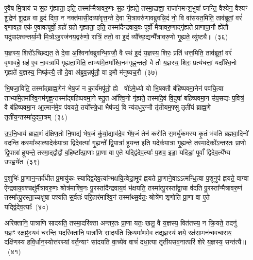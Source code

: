 ए॒वैष मि॒त्राय॑ च स॒ह गृ॑ह्याता॒ इति॒ तस्मा᳚न्मैत्रावरु॒णः स॒ह गृ॑ह्यते॒ तस्मा॒द्राज्ञा॒ राजा॑नमꣳश॒भुवा᳚ घ्नन्ति॒ वैश्ये॑न॒ वैश्यꣳ॑ शू॒द्रेण॑ शू॒द्रन्न वा इ॒दं दिवा॒ न नक्त॑मासी॒दव्या॑वृत्त॒न्ते दे॒वा मि॒त्रावरु॑णावब्रुवन्नि॒दं नो॒ वि वा॑सयत॒मिति॒ ताव॑ब्रूतां॒ वरं॑ वृणावहा॒ एक॑ ए॒वावत्पूर्वो॒ ग्रहो॑ ग्रहो गृह्याता॒ इति॒ तस्मा॑दैन्द्रवाय॒वः पूर्वो॑ मैत्रावरु॒णाद्गृ॑ह्यते प्राणापा॒नौ ह्ये॑तौ यदु॑पाꣴश्वन्तर्या॒मौ मि॒त्रो\-ऽह॒रज॑नय॒द्वरु॑णो॒ रात्रिं॒ ततो॒ वा इ॒दं व्यौ᳚च्छ॒द्यन्मै᳚त्रावरु॒णो गृ॒ह्यते॒ व्यु॑ष्ट्यै॥~(३६)

{\anuvakamend[{ए॒ष चै᳚न्द्रवाय॒वो द्वाविꣳ॑शतिश्च}]}%

य॒ज्ञस्य॒ शिरो᳚\-ऽच्छिद्यत॒ ते दे॒वा अ॒श्विना॑वब्रुवन्भि॒षजौ॒ वै स्थ॑ इ॒दं य॒ज्ञस्य॒ शिरः॒ प्रति॑ धत्त॒मिति॒ ताव॑ब्रूतां॒ वरं॑ वृणावहै॒ ग्रह॑ ए॒व ना॒वत्रापि॑ गृह्यता॒मिति॒ ताभ्या॑मे॒तमा᳚श्वि॒नम॑गृह्ण॒न्ततो॒ वै तौ य॒ज्ञस्य॒ शिरः॒ प्रत्य॑धत्तां॒ यदा᳚श्वि॒नो गृ॒ह्यते॑ य॒ज्ञस्य॒ निष्कृ॑त्यै॒ तौ दे॒वा अ॑ब्रुव॒न्नपू॑तौ॒ वा इ॒मौ म॑नुष्यच॒रौ~(३७)

भि॒षजा॒विति॒ तस्मा᳚द्ब्राह्म॒णेन॑ भेष॒जं न का॒र्य॑मपू॑तो॒ ह्ये  षो॑\-ऽमे॒ध्यो यो भि॒षक्तौ ब॑हिष्पवमा॒नेन॑ पवयि॒त्वा ताभ्या॑मे॒तमा᳚श्वि॒नम॑गृह्ण॒न्तस्मा᳚द्बहिष्पवमा॒ने स्तु॒त आ᳚श्वि॒नो गृ॑ह्यते॒ तस्मा॑दे॒वं वि॒दुषा॑ बहिष्पवमा॒न उ॑प॒सद्यः॑ प॒वित्रं॒ वै ब॑हिष्पवमा॒न आ॒त्मान॑मे॒व प॑वयते॒ तयो᳚स्त्रे॒धा भैष॑ज्यं॒ वि न्य॑दधुर॒ग्नौ तृ॑तीयम॒फ्सु तृती॑यं ब्राह्म॒णे तृती॑य॒न्तस्मा॑दुदपा॒त्रम्~(३८)

उ॒प॒नि॒धाय॑ ब्राह्म॒णं द॑क्षिण॒तो नि॒षाद्य॑ भेष॒जं कु॑र्या॒द्याव॑दे॒व भे॑ष॒जं तेन॑ करोति स॒मर्धु॑कमस्य कृ॒तं भ॑वति ब्रह्मवा॒दिनो॑ वदन्ति॒ कस्मा᳚थ्स॒त्यादेक॑पात्रा द्विदेव॒त्या॑ गृ॒ह्यन्ते᳚ द्वि॒पात्रा॑ हूयन्त॒ इति॒ यदेक॑पात्रा गृ॒ह्यन्ते॒ तस्मा॒देको᳚\-ऽन्तर॒तः प्रा॒णो द्वि॒पात्रा॑ हूयन्ते॒ तस्मा॒द्द्वौद्वौ॑ ब॒हिष्टा᳚त्प्रा॒णाः प्रा॒णा वा ए॒ते यद्द्वि॑देव॒त्याः᳚ प॒शव॒ इडा॒ यदिडां॒ पूर्वां᳚ द्विदेव॒त्ये᳚भ्य उप॒ह्वये॑त~(३९)

प॒शुभिः॑ प्रा॒णान॒न्तर्द॑धीत प्र॒मायु॑कः स्याद्द्विदेव॒त्या᳚न्भक्षयि॒त्वेडा॒मुप॑ ह्वयते प्रा॒णाने॒वा\-ऽऽ\-त्मन्धि॒त्वा प॒शूनुप॑ ह्वयते॒ वाग्वा ऐ᳚न्द्रवाय॒वश्चक्षु॑र्मैत्रावरु॒णः श्रोत्र॑माश्वि॒नः पु॒रस्ता॑दैन्द्रवाय॒वं भ॑क्षयति॒ तस्मा᳚त्पु॒रस्ता᳚द्वा॒चा व॑दति पु॒रस्ता᳚न्मैत्रावरु॒णं तस्मा᳚त्पु॒रस्ता॒च्चक्षु॑षा पश्यति स॒र्वतः॑ परि॒हार॑माश्वि॒नं तस्मा᳚थ्स॒र्वतः॒ श्रोत्रे॑ण शृणोति प्रा॒णा वा ए॒ते यद्द्वि॑देव॒त्याः᳚~(४०)

अरि॑क्तानि॒ पात्रा॑णि सादयति॒ तस्मा॒दरि॑क्ता अन्तर॒तः प्रा॒णा यतः॒ खलु॒ वै य॒ज्ञस्य॒ वित॑तस्य॒ न क्रि॒यते॒ तदनु॑ य॒ज्ञꣳ रक्षा॒ꣴ॒स्यव॑ चरन्ति॒ यदरि॑क्तानि॒ पात्रा॑णि सा॒दय॑ति क्रि॒यमा॑णमे॒व तद्य॒ज्ञस्य॑ शये॒ रक्ष॑सा॒मन॑न्ववचाराय॒ दक्षि॑णस्य हवि॒र्धान॒स्योत्त॑रस्यां वर्त॒न्याꣳ सा॑दयति वा॒च्ये॑व वाचं॑ दधा॒त्या तृ॑तीयसव॒नात्परि॑ शेरे य॒ज्ञस्य॒ सन्त॑त्यै॥~(४१)


